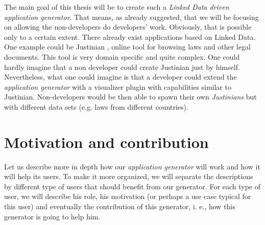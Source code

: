 The main goal of this thesis will be to create such a \emph{Linked Data driven application generator}. That means, as already suggested, that we will be focusing on allowing the non-developers do developers' work. Obviously, that is possible only to a certain extent. There already exist applications based on Linked Data. One example could be Justinian \cite{justinian}, online tool for browsing laws and other legal documents. This tool is very domain specific and quite complex. One could hardly imagine that a non developer could create Justinian just by himself. Nevertheless, what one could imagine is that a developer could extend the \emph{application generator} with a visualizer plugin with capabilities similar to Justinian. Non-developers would be then able to spawn their own \emph{Justinians} but with different data sets (e.g. laws from different countries).

\section*{Motivation and contribution}
%
%
%
Let us describe more in depth how our \emph{application generator} will work and how it will help its users. To make it more organized, we will separate the descriptions by different type of users that should benefit from our generator. For each type of user, we will describe his role, his motivation (or perhaps a use case typical for this user) and eventually the contribution of this generator, i. e., how this generator is going to help him.

